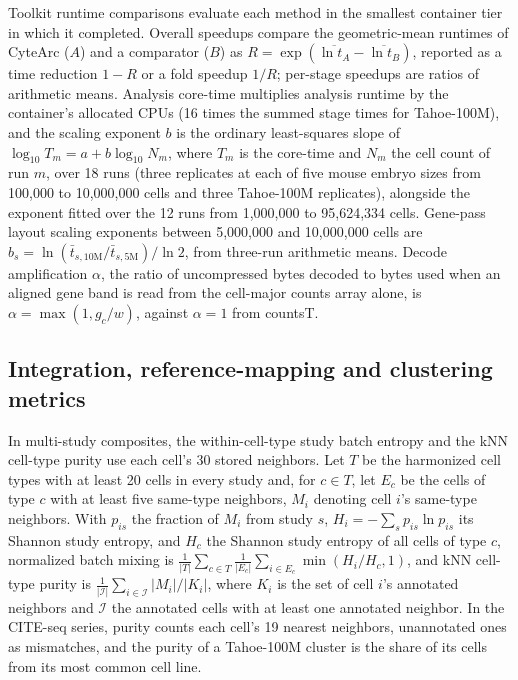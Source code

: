 \documentclass[11pt]{article}
\begin{document}
Toolkit runtime comparisons evaluate each method in the smallest container tier in which it completed. Overall speedups compare the geometric-mean runtimes of CyteArc ($A$) and a comparator ($B$) as $R=\exp(\overline{\ln t_A}-\overline{\ln t_B})$, reported as a time reduction $1-R$ or a fold speedup $1/R$; per-stage speedups are ratios of arithmetic means. Analysis core-time multiplies analysis runtime by the container's allocated CPUs (16 times the summed stage times for Tahoe-100M), and the scaling exponent $b$ is the ordinary least-squares slope of $\log_{10}T_m=a+b\log_{10}N_m$, where $T_m$ is the core-time and $N_m$ the cell count of run $m$, over 18 runs (three replicates at each of five mouse embryo sizes from 100,000 to 10,000,000 cells and three Tahoe-100M replicates), alongside the exponent fitted over the 12 runs from 1,000,000 to 95,624,334 cells. Gene-pass layout scaling exponents between 5,000,000 and 10,000,000 cells are $b_s=\ln(\bar t_{s,10\mathrm{M}}/\bar t_{s,5\mathrm{M}})/\ln2$, from three-run arithmetic means. Decode amplification $\alpha$, the ratio of uncompressed bytes decoded to bytes used when an aligned gene band is read from the cell-major counts array alone, is $\alpha=\max(1,g_c/w)$, against $\alpha=1$ from countsT.

\subsection*{Integration, reference-mapping and clustering metrics}\label{sec:Metrics}

In multi-study composites, the within-cell-type study batch entropy and the kNN cell-type purity use each cell's 30 stored neighbors. Let $T$ be the harmonized cell types with at least 20 cells in every study and, for $c\in T$, let $E_c$ be the cells of type $c$ with at least five same-type neighbors, $M_i$ denoting cell $i$'s same-type neighbors. With $p_{is}$ the fraction of $M_i$ from study $s$, $H_i=-\sum_{s}p_{is}\ln p_{is}$ its Shannon study entropy, and $H_c$ the Shannon study entropy of all cells of type $c$, normalized batch mixing is $\frac{1}{\lvert T\rvert}\sum_{c\in T}\frac{1}{\lvert E_c\rvert}\sum_{i\in E_c}\min(H_i/H_c,1)$, and kNN cell-type purity is $\frac{1}{\lvert\mathcal{I}\rvert}\sum_{i\in\mathcal{I}}\lvert M_i\rvert/\lvert K_i\rvert$, where $K_i$ is the set of cell $i$'s annotated neighbors and $\mathcal{I}$ the annotated cells with at least one annotated neighbor. In the CITE-seq series, purity counts each cell's 19 nearest neighbors, unannotated ones as mismatches, and the purity of a Tahoe-100M cluster is the share of its cells from its most common cell line.
\end{document}
